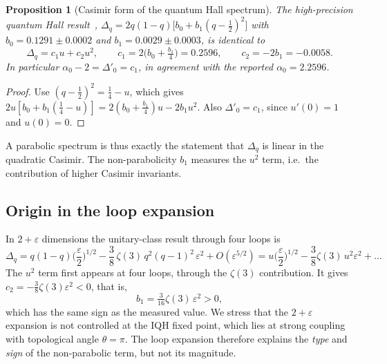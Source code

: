 \documentclass[11pt]{article}
\newtheorem{proposition}{Proposition}[section]
\theoremstyle{definition}\newtheorem{definition}{Definition}[section]
\theoremstyle{remark}\newtheorem*{remark}{Remark}
\begin{document}
\begin{proposition}[Casimir form of the quantum Hall spectrum]
\label{prop:casimir}
The high-precision quantum Hall result~\cite{EMM},
$\Delta_q=2q(1-q)\big[b_0+b_1(q-\tfrac12)^2\big]$ with $b_0=0.1291\pm0.0002$ and $b_1=0.0029\pm0.0003$, is identical to
\begin{equation}
\Delta_q=c_1u+c_2u^2,\qquad c_1=2\big(b_0+\tfrac{b_1}{4}\big)=0.2596,\qquad c_2=-2b_1=-0.0058 .
\end{equation}
In particular $\alpha_0-2=\Delta'_0=c_1$, in agreement with the reported $\alpha_0=2.2596$.
\end{proposition}
\begin{proof}
Use $(q-\tfrac12)^2=\tfrac14-u$, which gives $2u[b_0+b_1(\tfrac14-u)]=2(b_0+\tfrac{b_1}4)u-2b_1u^2$. Also
$\Delta'_0=c_1$, since $u'(0)=1$ and $u(0)=0$.
\end{proof}
A parabolic spectrum is thus exactly the statement that $\Delta_q$ is linear in the quadratic Casimir. The
non-parabolicity $b_1$ measures the $u^2$ term, i.e.\ the contribution of higher Casimir invariants.

\subsection{Origin in the loop expansion}
In $2+\varepsilon$ dimensions the unitary-class result through four loops is~\cite{EversMirlin}
\begin{equation}
\Delta_q=q(1-q)\Big(\frac{\varepsilon}{2}\Big)^{1/2}-\frac38\,\zeta(3)\,q^2(q-1)^2\,\varepsilon^2+O(\varepsilon^{5/2})
=u\Big(\frac{\varepsilon}{2}\Big)^{1/2}-\frac38\zeta(3)\,u^2\varepsilon^2+\dots
\end{equation}
The $u^2$ term first appears at four loops, through the $\zeta(3)$ contribution. It gives $c_2=-\frac38\zeta(3)\varepsilon^2<0$,
that is,
\begin{equation}
b_1=\tfrac{3}{16}\zeta(3)\,\varepsilon^2>0,
\end{equation}
which has the same sign as the measured value. We stress that the $2+\varepsilon$ expansion is not controlled at
the IQH fixed point, which lies at strong coupling with topological angle $\theta=\pi$. The loop expansion
therefore explains the \emph{type} and \emph{sign} of the non-parabolic term, but not its magnitude.
\end{document}
